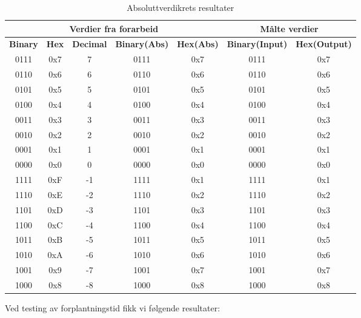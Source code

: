 \begin{table}[!htb]
  \caption{Absoluttverdikrets resultater}
  \label{absoluttverdikrets}
  \begin{tabular}{c c c c c|c c}
    \multicolumn{5}{c|}{\textbf{Verdier fra forarbeid}} & \multicolumn{2}{c}{\textbf{Målte verdier}} \\ \hline
    \textbf{Binary} & \textbf{Hex} & \textbf{Decimal}  & \textbf{Binary(Abs)}  & \textbf{Hex(Abs)}  & \textbf{Binary(Input)} &  \textbf{Hex(Output)}\\ \hline
    0111  & 0x7 & 7 & 0111  & 0x7 & 0111  & 0x7 \\
    0110  & 0x6 & 6 & 0110  & 0x6 & 0110  & 0x6 \\
    0101  & 0x5 & 5 & 0101  & 0x5 & 0101  & 0x5 \\
    0100  & 0x4 & 4 & 0100  & 0x4 & 0100  & 0x4 \\
    0011  & 0x3 & 3 & 0011  & 0x3 & 0011  & 0x3 \\
    0010  & 0x2 & 2 & 0010  & 0x2 & 0010  & 0x2 \\
    0001  & 0x1 & 1 & 0001  & 0x1 & 0001  & 0x1 \\
    0000  & 0x0 & 0 & 0000  & 0x0 & 0000  & 0x0 \\ \hline
    1111  & 0xF & -1 & 1111  & 0x1 & 1111  & 0x1 \\
    1110  & 0xE & -2 & 1110  & 0x2 & 1110  & 0x2 \\
    1101  & 0xD & -3 & 1101  & 0x3 & 1101  & 0x3 \\
    1100  & 0xC & -4 & 1100  & 0x4 & 1100  & 0x4 \\
    1011  & 0xB & -5 & 1011  & 0x5 & 1011  & 0x5 \\
    1010  & 0xA & -6 & 1010  & 0x6 & 1010  & 0x6 \\
    1001  & 0x9 & -7 & 1001  & 0x7 & 1001  & 0x7 \\
    1000  & 0x8 & -8 & 1000  & 0x8 & 1000  & 0x8 \\

  \end{tabular}
  \label{Tabell:5}
\end{table}

\clearpage

Ved testing av forplantningstid fikk vi følgende resultater:

